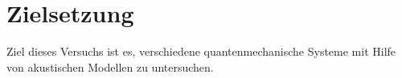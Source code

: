 \section{Zielsetzung}

Ziel dieses Versuchs ist es, verschiedene quantenmechanische Systeme mit Hilfe von akustischen Modellen zu untersuchen.
